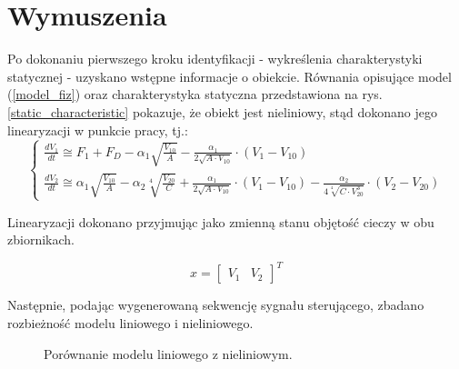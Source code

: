 \documentclass[a4paper,titlepage,11pt,floatssmall]{mwrep}
\begin{document}
\newpage

\section{Wymuszenia}
Po dokonaniu pierwszego kroku identyfikacji - wykreślenia charakterystyki statycznej - uzyskano wstępne informacje o obiekcie. Równania opisujące model (\ref{model_fiz}) oraz charakterystyka statyczna przedstawiona na rys. \ref{static_characteristic} pokazuje, że obiekt jest nieliniowy, stąd dokonano jego linearyzacji w punkcie pracy, tj.:
\begin{equation}
\begin{cases}
\frac{dV_1}{dt} \cong F_1 + F_D - \alpha_1 \sqrt{\frac{V_{10}}{A}} - \frac{\alpha_1}{2 \sqrt{A \cdot V_{10}}} \cdot (V_1 - V_{10})\\
\frac{dV_2}{dt} \cong \alpha_1 \sqrt{\frac{V_{10}}{A}} - \alpha_2 \sqrt[4]{\frac{V_{20}}{C}} + \frac{\alpha_1}{2 \sqrt{A \cdot V_{10}}} \cdot (V_1 - V_{10}) - \frac{\alpha_2}{4 \sqrt[4]{C \cdot V_{20}^3}} \cdot (V_2 - V_{20})
\end{cases}
\end{equation}

\noindent Linearyzacji dokonano przyjmując jako zmienną stanu objętość cieczy w obu zbiornikach. 

\begin{equation}
x = \begin{bmatrix} V_1 & V_2 \end{bmatrix}^T
\end{equation}

Następnie, podając wygenerowaną sekwencję sygnału sterującego, zbadano rozbieżność modelu liniowego i nieliniowego.

\begin{figure}[h!]
\centering
{}
\hfill
{}
\caption{Porównanie modelu liniowego z nieliniowym.}
\end{figure}
\end{document}
